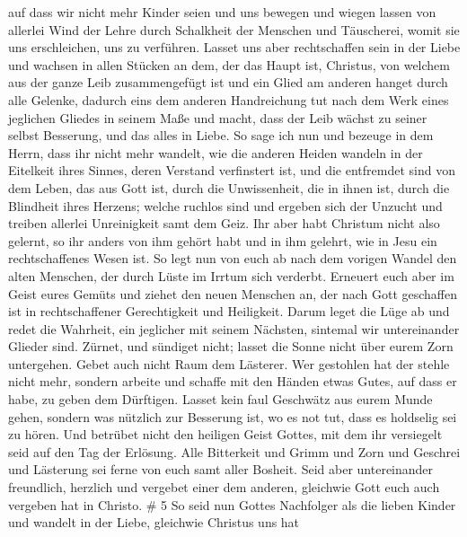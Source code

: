  auf dass wir nicht mehr Kinder seien und uns bewegen und
wiegen lassen von allerlei Wind der Lehre durch Schalkheit der Menschen
und Täuscherei, womit sie uns erschleichen, uns zu verführen.
 Lasset uns aber rechtschaffen sein in der Liebe und
wachsen in allen Stücken an dem, der das Haupt ist, Christus,
 von welchem aus der ganze Leib zusammengefügt ist und ein
Glied am anderen hanget durch alle Gelenke, dadurch eins dem anderen
Handreichung tut nach dem Werk eines jeglichen Gliedes in seinem Maße
und macht, dass der Leib wächst zu seiner selbst Besserung, und das
alles in Liebe.  So sage ich nun und bezeuge in dem Herrn,
dass ihr nicht mehr wandelt, wie die anderen Heiden wandeln in der
Eitelkeit ihres Sinnes,  deren Verstand verfinstert ist,
und die entfremdet sind von dem Leben, das aus Gott ist, durch die
Unwissenheit, die in ihnen ist, durch die Blindheit ihres Herzens;
 welche ruchlos sind und ergeben sich der Unzucht und
treiben allerlei Unreinigkeit samt dem Geiz.  Ihr aber habt
Christum nicht also gelernt,  so ihr anders von ihm gehört
habt und in ihm gelehrt, wie in Jesu ein rechtschaffenes Wesen ist.
 So legt nun von euch ab nach dem vorigen Wandel den alten
Menschen, der durch Lüste im Irrtum sich verderbt. 
Erneuert euch aber im Geist eures Gemüts  und ziehet den
neuen Menschen an, der nach Gott geschaffen ist in rechtschaffener
Gerechtigkeit und Heiligkeit.  Darum leget die Lüge ab und
redet die Wahrheit, ein jeglicher mit seinem Nächsten, sintemal wir
untereinander Glieder sind.  Zürnet, und sündiget nicht;
lasset die Sonne nicht über eurem Zorn untergehen.  Gebet
auch nicht Raum dem Lästerer.  Wer gestohlen hat der stehle
nicht mehr, sondern arbeite und schaffe mit den Händen etwas Gutes, auf
dass er habe, zu geben dem Dürftigen.  Lasset kein faul
Geschwätz aus eurem Munde gehen, sondern was nützlich zur Besserung ist,
wo es not tut, dass es holdselig sei zu hören.  Und
betrübet nicht den heiligen Geist Gottes, mit dem ihr versiegelt seid
auf den Tag der Erlösung.  Alle Bitterkeit und Grimm und
Zorn und Geschrei und Lästerung sei ferne von euch samt aller Bosheit.
 Seid aber untereinander freundlich, herzlich und vergebet
einer dem anderen, gleichwie Gott euch auch vergeben hat in Christo. \#
5  So seid nun Gottes Nachfolger als die lieben Kinder
 und wandelt in der Liebe, gleichwie Christus uns hat
